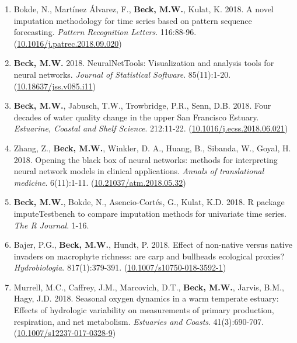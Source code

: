 \documentclass[letterpaper,12pt]{article}
\begin{document}
\begin{enumerate}
\item Bokde, N., Mart\'{i}nez \'{A}lvarez, F., \textbf{Beck, M.W.}, Kulat, K. 2018. A novel imputation methodology for time series based on pattern sequence forecasting. \textit{Pattern Recognition Letters}. 116:88-96. ({\footnotesize\href{https://doi.org/10.1016/j.patrec.2018.09.020}{10.1016/j.patrec.2018.09.020}})

\item \textbf{Beck, M.W.} 2018. NeuralNetTools: Visualization and analysis tools for neural networks. \textit{Journal of Statistical Software}. 85(11):1-20. ({\footnotesize\href{http://dx.doi.org/10.18637/jss.v085.i11}{10.18637/jss.v085.i11}})

\item \textbf{Beck, M.W.}, Jabusch, T.W., Trowbridge, P.R., Senn, D.B. 2018. Four decades of water quality change in the upper San Francisco Estuary. \textit{Estuarine, Coastal and Shelf Science}. 212:11-22. ({\footnotesize\href{https://doi.org/10.1016/j.ecss.2018.06.021}{10.1016/j.ecss.2018.06.021}})

\item Zhang, Z., \textbf{Beck, M.W.}, Winkler, D. A., Huang, B., Sibanda, W., Goyal, H. 2018. Opening the black box of neural networks: methods for interpreting neural network models in clinical applications. \textit{Annals of translational medicine}. 6(11):1-11. ({\footnotesize\href{http://dx.doi.org/10.21037/atm.2018.05.32}{10.21037/atm.2018.05.32}})

\item \textbf{Beck, M.W.}, Bokde, N., Asencio-Cort\'{e}s, G., Kulat, K.D. 2018. R package imputeTestbench to compare imputation methods for univariate time series. \textit{The R Journal}. 1-16.

\item Bajer, P.G., \textbf{Beck, M.W.}, Hundt, P. 2018. Effect of non-native versus native invaders on macrophyte richness: are carp and bullheads ecological proxies? \textit{Hydrobiologia}. 817(1):379-391. ({\footnotesize\href{https://link.springer.com/article/10.1007/s10750-018-3592-1}{10.1007/s10750-018-3592-1}})

\item Murrell, M.C., Caffrey, J.M., Marcovich, D.T., \textbf{Beck, M.W.}, Jarvis, B.M., Hagy, J.D. 2018. Seasonal oxygen dynamics in a warm temperate estuary: Effects of hydrologic variability on measurements of primary production, respiration, and net metabolism. \textit{Estuaries and Coasts}. 41(3):690-707. ({\footnotesize\href{https://link.springer.com/article/10.1007/s12237-017-0328-9}{10.1007/s12237-017-0328-9}})


\end{enumerate}
\end{document}
